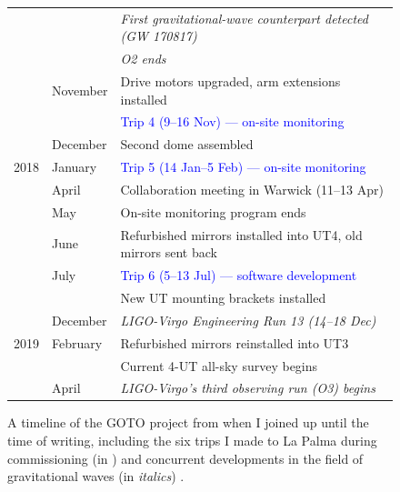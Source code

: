 \begin{colsection}
\begin{colsection}
\begin{figure}[p]
\begin{center}
\begin{tabular}{cl|@{\tls}l}
                 &           & \textit{First gravitational-wave counterpart detected (GW 170817)} \\
                 &           & \textit{O2 ends} \\
                 & November  & Drive motors upgraded, arm extensions installed \\
                 &           & \textcolor{Blue}{Trip 4 (9--16 Nov) --- on-site monitoring} \\
                 & December  & Second dome assembled \\
            \midrule
            2018 & January   & \textcolor{Blue}{Trip 5 (14 Jan--5 Feb) --- on-site monitoring} \\
                 & April     & Collaboration meeting in Warwick (11--13 Apr)\\
                 & May       & On-site monitoring program ends \\
                 & June      & Refurbished mirrors installed into UT4, old mirrors sent back \\
                 & July      & \textcolor{Blue}{Trip 6 (5--13 Jul) --- software development} \\
                 &           & New UT mounting brackets installed \\
                 & December  & \textit{LIGO-Virgo Engineering Run 13 (14--18 Dec)} \\
            \midrule
            2019 & February  & Refurbished mirrors reinstalled into UT3 \\
                 &           & Current 4-UT all-sky survey begins \\
                 & April     & \textit{LIGO-Virgo's third observing run (O3) begins} \\
        \end{tabular}
    \end{center}
    \caption[Timeline of the GOTO project]{
        A timeline of the GOTO project from when I joined up until the time of writing, including the six trips I made to La Palma during commissioning (in ) and concurrent developments in the field of gravitational waves (in \textit{italics}) .
    }\label{tab:timeline}
\end{figure}

\clearpage


\end{colsection}
\end{colsection}
